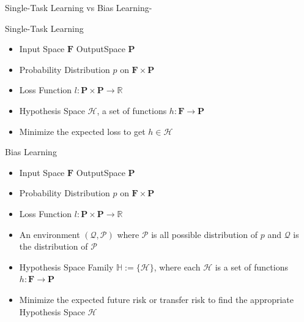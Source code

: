 \begin{frame}{Single-Task Learning vs Bias Learning-}
  {
    \begin{block}{\color{White} Single-Task Learning}
      \begin{itemize}
        \item Input Space $\mathbf{F}$ OutputSpace $\mathbf{P}$
        \item Probability Distribution $p$ on $\mathbf{F}\times\mathbf{P}$
        \item Loss Function $l:\mathbf{P}\times\mathbf{P}\to \mathbb{R}$
        \item Hypothesis Space $\mathcal{H}$, a set of functions $h:\mathbf{F}\to\mathbf{P}$
        \item Minimize the expected loss to get $h\in\mathcal{H}$
      \end{itemize}
    \end{block}
  }
  {
    \begin{block}{\color{White} Bias  Learning}
      \begin{itemize}
         \item Input Space $\mathbf{F}$ OutputSpace $\mathbf{P}$
        \item Probability Distribution $p$ on $\mathbf{F}\times\mathbf{P}$
        \item Loss Function $l:\mathbf{P}\times\mathbf{P}\to \mathbb{R}$
        \item An environment $(\mathcal{Q},\mathcal{P})$ where $\mathcal{P}$ is all possible distribution of $p$ and $\mathcal{Q}$ is the distribution of $\mathcal{P}$
        \item Hypothesis Space Family $\mathbb{H}:=\{\mathcal{H}\}$, where each $\mathcal{H}$ is a set of functions $h:\mathbf{F}\to\mathbf{P}$
        \item Minimize the expected future risk or transfer risk to find the appropriate Hypothesis Space $\mathcal{H}$ 
      \end{itemize}
    \end{block}
  }
\end{frame}

